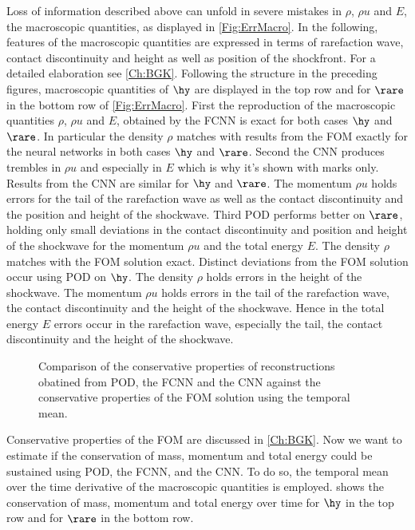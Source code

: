 Loss of information described above can unfold in severe mistakes in \(\rho\), \(\rho u\) and \(E\), the macroscopic quantities, as displayed in \cref{Fig:ErrMacro}. In the following, features of the macroscopic quantities are expressed in terms of rarefaction wave, contact discontinuity and height as well as position of the shockfront. For a detailed elaboration see \cref{Ch:BGK}. Following the structure in the preceding figures, macroscopic quantities of \(\hy\) are displayed in the top row and for \(\rare\) in the bottom row of \cref{Fig:ErrMacro}. First the reproduction of the macroscopic quantities \(\rho\), \(\rho u\) and \(E\), obtained by the FCNN is exact for both cases \(\hy\) and \(\rare\). In particular the density \(\rho\) matches with results from the FOM exactly for the neural networks in both cases \(\hy\) and \(\rare\). Second the CNN produces trembles in \(\rho u\) and especially in \(E\) which is why it's shown with marks only. Results from the CNN are similar for \(\hy\) and \(\rare\). The momentum \(\rho u\) holds errors for the tail of the rarefaction wave as well as the contact discontinuity and the position and height of the shockwave. Third POD performs better on \(\rare\), holding only small deviations in the contact discontinuity and position and height of the shockwave for the momentum \(\rho u\) and the total energy \(E\). The density \(\rho\) matches with the FOM solution exact. Distinct deviations from the FOM solution occur using POD on \(\hy\). The density \(\rho\) holds errors in the  height of the shockwave. The momentum \(\rho u\) holds errors in the tail of the rarefaction wave, the contact discontinuity and the height of the shockwave. Hence in the total energy \(E\) errors occur in the rarefaction wave, especially the tail, the contact discontinuity and the height of the shockwave.
\begin{figure}[H]
	
	\caption{Comparison of the conservative properties of reconstructions obatined from POD, the FCNN and the CNN against the conservative properties of the FOM solution using the temporal mean.}
	\label{Fig:Conservation}
\end{figure}
Conservative properties of the FOM are discussed in \cref{Ch:BGK}. Now we want to estimate if the conservation of mass, momentum and total energy could be sustained using POD, the FCNN, and the CNN. To do so, the temporal mean over the time derivative of the macroscopic quantities is employed.  shows the conservation of mass, momentum and total energy over time for \(\hy\) in the top row and for \(\rare\) in the bottom row.\\
